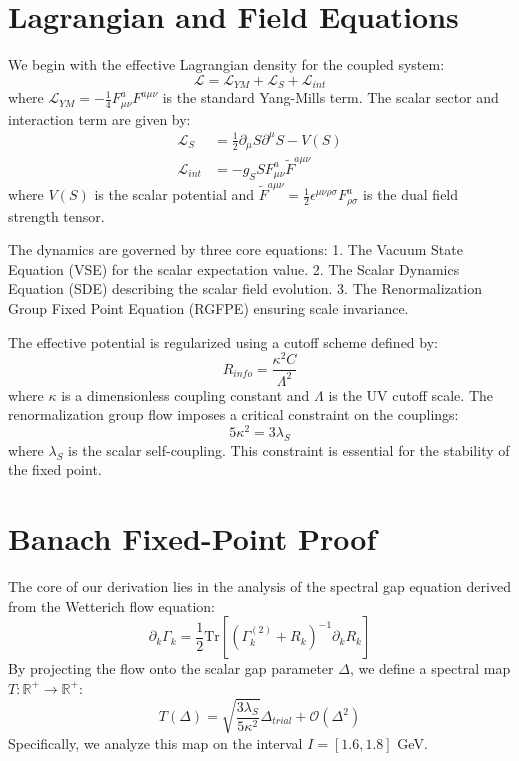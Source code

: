 \documentclass[aps,prd,twocolumn,superscriptaddress,nofootinbib,10pt]{revtex4-2}
\begin{document}
\section{Lagrangian and Field Equations}
We begin with the effective Lagrangian density for the coupled system:
\begin{equation}
\mathcal{L} = \mathcal{L}_{YM} + \mathcal{L}_S + \mathcal{L}_{int}
\end{equation}
where $\mathcal{L}_{YM} = -\frac{1}{4} F_{\mu\nu}^a F^{a\mu\nu}$ is the standard Yang-Mills term. The scalar sector and interaction term are given by:
\begin{align}
\mathcal{L}_S &= \frac{1}{2} \partial_\mu S \partial^\mu S - V(S) \\
\mathcal{L}_{int} &= -g_{S} S F_{\mu\nu}^a \tilde{F}^{a\mu\nu}
\end{align}
where $V(S)$ is the scalar potential and $\tilde{F}^{a\mu\nu} = \frac{1}{2} \epsilon^{\mu\nu\rho\sigma} F_{\rho\sigma}^a$ is the dual field strength tensor.

The dynamics are governed by three core equations:
1. The Vacuum State Equation (VSE) for the scalar expectation value.
2. The Scalar Dynamics Equation (SDE) describing the scalar field evolution.
3. The Renormalization Group Fixed Point Equation (RGFPE) ensuring scale invariance.

The effective potential is regularized using a cutoff scheme defined by:
\begin{equation}
R_{info} = \frac{\kappa^2 C}{\Lambda^2}
\end{equation}
where $\kappa$ is a dimensionless coupling constant and $\Lambda$ is the UV cutoff scale. The renormalization group flow imposes a critical constraint on the couplings:
\begin{equation}
5\kappa^2 = 3\lambda_S
\end{equation}
where $\lambda_S$ is the scalar self-coupling. This constraint is essential for the stability of the fixed point.

\section{Banach Fixed-Point Proof}
The core of our derivation lies in the analysis of the spectral gap equation derived from the Wetterich flow equation:
\begin{equation}
\partial_k \Gamma_k = \frac{1}{2} \text{Tr} \left[ (\Gamma_k^{(2)} + R_k)^{-1} \partial_k R_k \right]
\end{equation}
By projecting the flow onto the scalar gap parameter $\Delta$, we define a spectral map $T: \mathbb{R}^+ \to \mathbb{R}^+$:
\begin{equation}
T(\Delta) = \sqrt{\frac{3\lambda_S}{5\kappa^2}} \Delta_{trial} + \mathcal{O}(\Delta^2)
\end{equation}
Specifically, we analyze this map on the interval $I = [1.6, 1.8]$ GeV.
\end{document}
